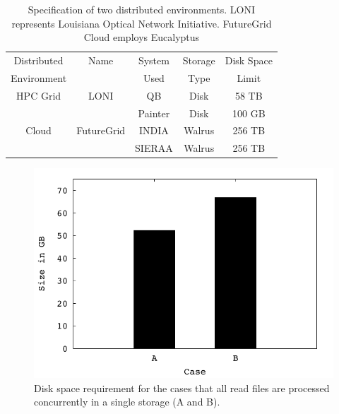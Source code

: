 \documentclass{acm_proc_article-sp}
\begin{document}
\begin{table}
\small
\begin{tabular}{|c|c|c|c|c|} 
\hline 
Distributed & Name & System &  Storage & Disk Space  \\
Environment & & Used & Type  &  Limit \\ \hline
HPC Grid & LONI & QB & Disk & 58 TB   \\
 &  &  Painter  & Disk &  100 GB  \\
Cloud & FutureGrid & INDIA & Walrus & 256 TB \\
&  &  SIERAA & Walrus & 256 TB \\  \hline
 
 
 
 
\end{tabular}
\caption{Specification of two distributed environments. LONI represents Louisiana Optical Network Initiative\cite{loni}. FutureGrid Cloud employs Eucalyptus}
\label{table:two-systems} 
\end{table}





\begin{figure}
 \centering
 \includegraphics[scale=0.66]{figures/diskspace.pdf}
\caption{\small Disk space requirement for the cases that all read
  files are processed concurrently in a single storage (A and B). %
}
  \label{fig:diskspace} 
 \end{figure}
\end{document}
